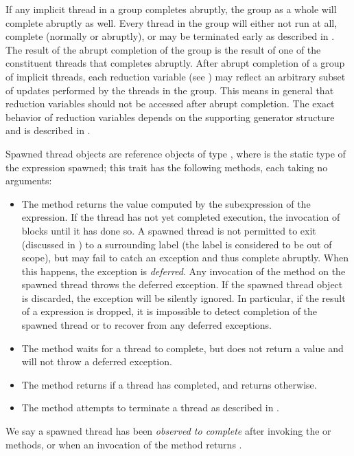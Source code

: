 If any implicit thread in a group completes abruptly, the group as a
whole will complete abruptly as well.  Every thread in the group will
either not run at all, complete (normally or abruptly), or may be
terminated early as described in .
The result of the abrupt completion of the group is
the result of one of the constituent threads that completes abruptly.
After abrupt completion of a group of implicit threads, each reduction
variable (see )
may reflect an arbitrary subset of updates performed by the
threads in the group.  This means in general that reduction variables
should not be accessed after abrupt completion.  The exact behavior of reduction variables depends on the supporting generator structure and is described in .

Spawned thread objects are reference objects of type
, where
 is the static type of the expression spawned;
this trait has the following methods, each taking no arguments:
\begin{itemize}
\item The  method returns the value computed by the
  subexpression of the  expression.  If the thread has not
  yet completed execution, the invocation of  blocks until it
 has done so.
 A spawned thread is not permitted to exit (discussed
 in ) to a surrounding label (the label is
 considered to be out of scope), but may fail to catch an exception
 and thus complete abruptly.
 When this happens, the exception is
 \emph{deferred}.  Any invocation of the  method on the
 spawned thread throws the deferred exception.  If the spawned thread
 object is discarded, the exception will be silently ignored.  In
 particular, if the result of a  expression is dropped, it
 is impossible to detect completion of the spawned thread or to
 recover from any deferred exceptions.
\item The  method waits for a thread to complete,
but does not return a value and will not throw a deferred exception.
\item The  method returns  if a thread
has completed, and returns  otherwise.
\item The  method attempts to terminate a thread
as described in .
\end{itemize}

We say a spawned thread has been \emph{observed to complete} after
invoking the  or  methods, or when an invocation of
the  method returns .

